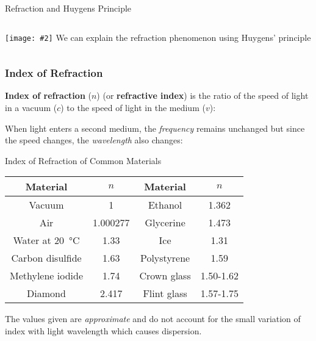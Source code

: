 \documentclass[compress,aspectratio=169]{beamer}
\newcommand{\pic}[2]{\texttt{[image: \#2]}}
\newcommand{\eq}[2]{\vspace{#1}{\LARGE\begin{displaymath}#2\end{displaymath}}}
\begin{document}
\begin{frame}{Refraction and Huygens Principle}
  \begin{columns}
    \pic{1}{huygen.png}
    We can explain the refraction phenomenon using Huygens' principle
  \end{columns}
\end{frame}



\begin{frame}
  \frametitle{Index of Refraction}

  \textbf{Index of refraction} ($n$) (or \textbf{refractive index}) is the
  ratio of the speed of light in a vacuum ($c$) to the speed of light in the
  medium ($v$):

  \eq{-.2in}{
    \boxed{n=\frac{c}{v}=\frac{\lambda_\mathrm{vacuum}}{\lambda}}
  }

  When light enters a second medium, the \emph{frequency} remains unchanged but
  since the speed changes, the \emph{wavelength} also changes:
    
  \eq{-.2in}{
    \boxed{\frac{n_1}{n_2}=\frac{\lambda_2}{\lambda_1}}
  }
\end{frame}



\begin{frame}{Index of Refraction of Common Materials}
  \begin{center}
    \begin{tabular}{c|c||c|c}
      \rowcolor{pink}
      \textbf{Material} & $n$ & \textbf{Material} & $n$ \\ \hline
      Vacuum           & 1        & Ethanol     & 1.362 \\
      Air              & 1.000277 & Glycerine   & 1.473 \\
      Water at \SI{20}{\celsius} & 1.33 & Ice         & 1.31 \\
      Carbon disulfide & 1.63     & Polystyrene & 1.59 \\
      Methylene iodide & 1.74     & Crown glass & 1.50-1.62\\
      Diamond          & 2.417    & Flint glass & 1.57-1.75
    \end{tabular}
  \end{center}
  The values given are \emph{approximate} and do not account for the small
  variation of index with light wavelength which causes dispersion.
\end{frame}
\end{document}
